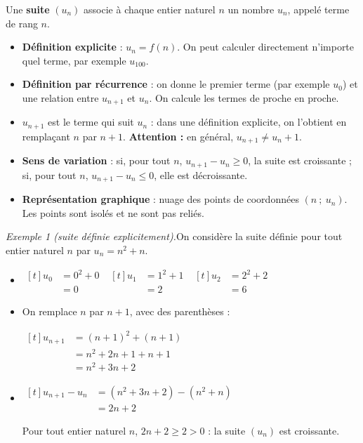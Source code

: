 \documentclass[10pt,a4paper]{article}
\begin{document}
\begin{bloc}
\begin{defis}
Une \textbf{suite} \((u_n)\) associe à chaque entier naturel \(n\) un nombre \(u_n\), appelé terme de rang \(n\).
\begin{itemize}
    \item \textbf{Définition explicite} : \(u_n=f(n)\). On peut calculer directement n'importe quel terme, par exemple \(u_{100}\).
    \item \textbf{Définition par récurrence} : on donne le premier terme (par exemple \(u_0\)) et une relation entre \(u_{n+1}\) et \(u_n\). On calcule les termes de proche en proche.
    \item \(u_{n+1}\) est le terme qui suit \(u_n\) : dans une définition explicite, on l'obtient en remplaçant \(n\) par \(n+1\). \textbf{Attention :} en général, \(u_{n+1}\neq u_n+1\).
    \item \textbf{Sens de variation} : si, pour tout \(n\), \(u_{n+1}-u_n\geq 0\), la suite est croissante ; si, pour tout \(n\), \(u_{n+1}-u_n\leq 0\), elle est décroissante.
    \item \textbf{Représentation graphique} : nuage des points de coordonnées \((n\ ;\ u_n)\). Les points sont isolés et ne sont pas reliés.
\end{itemize}
\end{defis}
\end{bloc}

\begin{bloc}
\textit{Exemple 1 (suite définie explicitement).}\enspace On considère la suite définie pour tout entier naturel \(n\) par \(u_n=n^2+n\).
\begin{itemize}
    \item \(\begin{aligned}[t] u_0&=0^2+0\\ &=0\end{aligned}\) \qquad \(\begin{aligned}[t] u_1&=1^2+1\\ &=2\end{aligned}\) \qquad \(\begin{aligned}[t] u_2&=2^2+2\\ &=6\end{aligned}\)
    \item On remplace \(n\) par \(n+1\), avec des parenthèses :

    \(\begin{aligned}[t] u_{n+1}&=(n+1)^2+(n+1)\\ &=n^2+2n+1+n+1\\ &=n^2+3n+2\end{aligned}\)
    \item \(\begin{aligned}[t] u_{n+1}-u_n&=(n^2+3n+2)-(n^2+n)\\ &=2n+2\end{aligned}\)

    Pour tout entier naturel \(n\), \(2n+2\geq 2>0\) : la suite \((u_n)\) est croissante.
\end{itemize}
\end{bloc}
\end{document}
